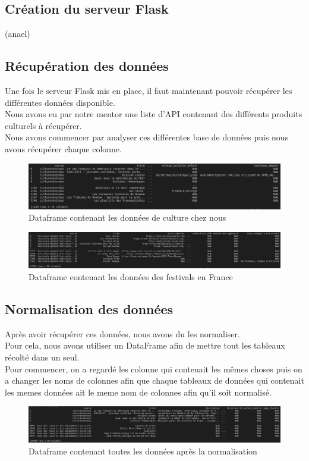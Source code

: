 \documentclass{article}
\begin{document}
\subsection{Création du serveur Flask}
(anael)

\subsection{Récupération des données}
Une fois le serveur Flask mis en place, il faut maintenant pouvoir récupérer les différentes données disponible.\\
Nous avons eu par notre mentor une liste d'API contenant des différents produits culturels à récupérer.\\
Nous avons commencer par analyser ces différentes base de données puis nous avons récupérer chaque colonne.\\
\begin{figure}[H]
\hspace{-25mm}
\includegraphics[scale = 0.44]{images/culturecheznous.png}
\caption{Dataframe contenant les données de culture chez nous}
\end{figure}
\begin{figure}[H]
\hspace{-25mm}
\includegraphics[scale = 0.354]{images/festivals.png}
\caption{Dataframe contenant les données des festivals en France}
\end{figure}

\subsection{Normalisation des données}
Après avoir récupérer ces données, nous avons du les normaliser.\\
Pour cela, nous avons utiliser un DataFrame afin de mettre tout les tableaux récolté dans un seul.\\
Pour commencer, on a regardé les colonne qui contenait les mêmes choses puis on a changer les noms de colonnes afin que chaque tableaux de données qui contenait les memes données ait le meme nom de colonnes afin qu'il soit normalisé.
\begin{figure}[H]
\hspace{-25mm}
\includegraphics[scale = 0.35]{images/dataframe_final.png}
\caption{Dataframe contenant toutes les données après la normalisation}
\end{figure}
\end{document}

